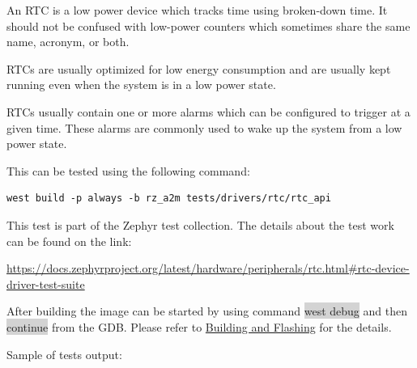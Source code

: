 \documentclass[11pt,a4paper,oneside]{article}
\begin{document}
An RTC is a low power device which tracks time using broken-down time.
It should not be confused with low-power counters which sometimes share
the same name, acronym, or both.

RTCs are usually optimized for low energy consumption and are usually
kept running even when the system is in a low power state.

RTCs usually contain one or more alarms which can be configured to
trigger at a given time. These alarms are commonly used to wake up the
system from a low power state.

This can be tested using the following command:

\begin{lstlisting}
west build -p always -b rz_a2m tests/drivers/rtc/rtc_api
\end{lstlisting}

This test is part of the Zephyr test collection. The details about the
test work can be found on the link:

\url{https://docs.zephyrproject.org/latest/hardware/peripherals/rtc.html\#rtc-device-driver-test-suite}

After building the image can be started by using command \colorbox{lightgray}{west debug}
and then \colorbox{lightgray}{continue} from the GDB. Please refer to
\hyperref[building-and-flashing]{Building and Flashing} for the
details.

Sample of tests output:
\end{document}
